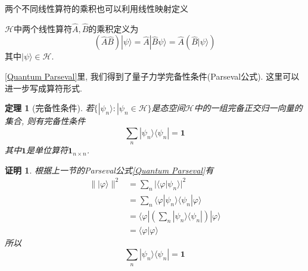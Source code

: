 \documentclass[a4paper,11pt]{article}
\theoremstyle{mystyle}
\newtheorem{theorem}{\hspace{2em}定理}[section]
\newtheorem{Proof}{\hspace{2em}证明}[section]
\begin{document}
两个不同线性算符的乘积也可以利用线性映射定义\\
\begin{minipage}[b]{0.75\linewidth}
\begin{definition}[线性算符的乘积]
    $\mathcal{H}$中两个线性算符$\hat{A},\hat{B}$的乘积定义为
\begin{equation*}
  (\hat{A}\hat{B})|\psi\rangle=\hat{A}|\hat{B}\psi\rangle=\hat{A}(\hat{B}|\psi\rangle)
\end{equation*}
其中$|\psi\rangle\in\mathcal{H}$.
\end{definition}
\end{minipage}
\begin{minipage}[b]{0.25\linewidth}
\end{minipage}

\ref{Quantum Parseval}里, 我们得到了量子力学完备性条件(Parseval公式). 这里可以进一步写成算符形式.
\begin{theorem}[完备性条件]\label{Quantum Completed condition}
  若$\{|\psi_n\rangle:|\psi_n\in\mathcal{H}\}$是态空间$\mathcal{H}$中的一组完备正交归一向量的集合, 则有完备性条件
\begin{equation*}
  \sum_{n}|\psi_n\rangle\langle\psi_n|=\mathbf{1}
\end{equation*}
其中$\mathbf{1}$是单位算符$\mathbf{1}_{n\times n}$.
\end{theorem}
\begin{Proof}
  根据上一节的Parseval公式\ref{Quantum Parseval}有
\begin{equation*}
  \begin{split}
     \||\varphi\rangle\|^2&=\sum_{n}|\langle\varphi|\psi_n\rangle|^2 \\
       & =\sum_{n}\langle\varphi|\psi_n\rangle\langle\psi_n|\varphi\rangle \\
       & =\langle\varphi|\left(\sum_{n}|\psi_n\rangle\langle\psi_n|\right)|\varphi\rangle \\
       & =\langle\varphi|\varphi\rangle
  \end{split}
\end{equation*}
所以
\begin{equation*}
  \sum_{n}|\psi_n\rangle\langle\psi_n|=\mathbf{1}
\end{equation*}
\end{Proof}
\end{document}
